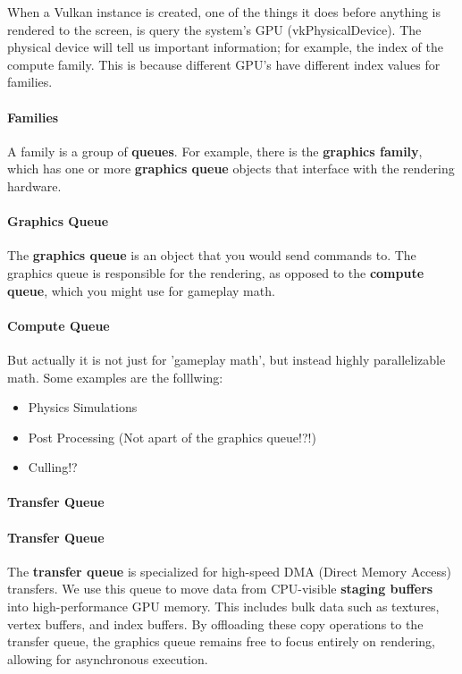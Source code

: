 \documentclass{article}
\begin{document}
\par When a Vulkan instance is created, one of the things it does
before anything is rendered to the screen, is query the system's GPU
(vkPhysicalDevice). The physical device will tell us important
information; for example, the index of the compute family. This is
because different GPU's have different index values for families.

\paragraph*{Families}

A family is a group of \textbf{queues}. For example, there is the
\textbf{graphics family}, which has one or more \textbf{graphics
queue} objects that interface with the rendering hardware.

\paragraph*{Graphics Queue}

The \textbf{graphics queue} is an object that you would send commands
to. The graphics queue is responsible for the rendering, as opposed
to the \textbf{compute queue}, which you might use for gameplay math.

\paragraph*{Compute Queue}

But actually it is not just for 'gameplay math', but instead highly
parallelizable math. Some examples are the folllwing:
\begin{itemize}
  \item Physics Simulations
  \item Post Processing (Not apart of the graphics queue!?!)
  \item Culling!?
\end{itemize}

\paragraph*{Transfer Queue}

\paragraph*{Transfer Queue}
The \textbf{transfer queue} is specialized for high-speed DMA (Direct
Memory Access) transfers. We use this queue to move data from
CPU-visible \textbf{staging buffers} into high-performance GPU
memory. This includes bulk data such as textures, vertex buffers, and
index buffers. By offloading these copy operations to the transfer
queue, the graphics queue remains free to focus entirely on
rendering, allowing for asynchronous execution.
\end{document}
